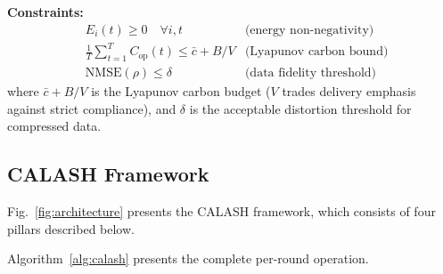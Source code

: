 \documentclass[12pt, onecolumn, journal]{IEEEtran}
\begin{document}
\textbf{Constraints:}
\begin{align}
    & E_i(t) \geq 0 \quad \forall i, t  &\text{(energy non-negativity)} \\
    & \frac{1}{T}\sum_{t=1}^{T} C_{\text{op}}(t) \leq \bar{c} + B/V  &\text{(Lyapunov carbon bound)} \\
    & \text{NMSE}(\rho) \leq \delta \quad &\text{(data fidelity threshold)}
\end{align}
where $\bar{c}+B/V$ is the Lyapunov carbon budget ($V$ trades delivery emphasis against strict compliance), and $\delta$ is the acceptable distortion threshold for compressed data.

\subsection{CALASH Framework}
\label{sec:four_pillars}

Fig.~\ref{fig:architecture} presents the CALASH framework, which consists of four pillars described below.

Algorithm~\ref{alg:calash} presents the complete per-round operation.
\end{document}

